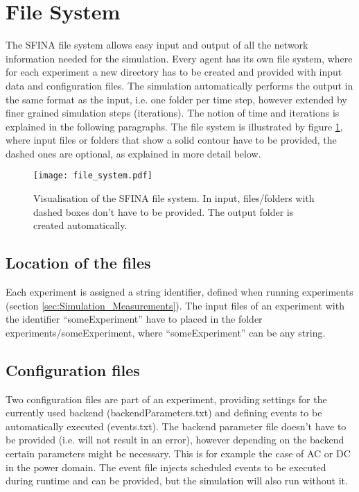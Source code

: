 \documentclass[11pt,fleqn]{book} %
\newcommand{\Backend}[1][]{Backend#1} %
\newcommand{\backend}[1][]{backend#1}
\newcommand{\domain}[1][]{domain#1}
\newcommand{\backendParametersFile}{backendParameters.txt}
\begin{document}

\section{File System}\label{sec:file_system}
The SFINA file system allows easy input and output of all the network information needed for the simulation. Every agent has its own file system, where for each experiment a new directory has to be created and provided with input data and configuration files. The simulation automatically performs the output in the same format as the input, i.e. one folder per time step, however extended by finer grained simulation steps (iterations). The notion of time and iterations is explained in the following paragraphs. The file system is illustrated by figure \ref{fig:file_system}, where input files or folders that show a solid contour have to be provided, the dashed ones are optional, as explained in more detail below.

\begin{figure}[h]
\centering\texttt{[image: file\_system.pdf]}
\caption{Visualisation of the SFINA file system. In input, files/folders with dashed boxes don't have to be provided. The output folder is created automatically.}
\label{fig:file_system}
\end{figure}

\subsection{Location of the files}
Each experiment is assigned a string identifier, defined when running experiments (section \ref{sec:Simulation_Measurements}). The input files of an experiment with the identifier “someExperiment” have to placed in the folder experiments/someExperiment, where “someExperiment” can be any string.

\subsection{Configuration files}\index{\Backend{}}\label{subsec:config_files}
Two configuration files are part of an experiment, providing settings for the currently used \backend{} (\backendParametersFile{}) and defining events to be automatically executed (events.txt). The \backend{} parameter file doesn’t have to be provided (i.e. will not result in an error), however depending on the \backend{} certain parameters might be necessary. This is for example the case of AC or DC in the power \domain{}. The event file injects scheduled events to be executed during runtime and can be provided, but the simulation will also run without it. 
\end{document}
